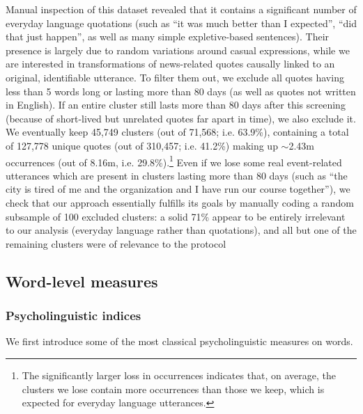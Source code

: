 Manual inspection of this dataset revealed that it contains a significant number of everyday language quotations (such as ``it was much better than I expected'', ``did that just happen'', as well as many simple expletive-based sentences).
Their presence is largely due to random variations around casual expressions, while we are interested in transformations of news-related quotes causally linked to an original, identifiable utterance.
To filter them out, we exclude all quotes having less than 5 words long or lasting more than 80 days %
 (as well as quotes not written in English). If an entire cluster still lasts more than 80 days after this screening (because of short-lived but unrelated quotes far apart in time), we also exclude it.
We eventually keep 45,749 clusters (out of 71,568; i.e. 63.9\%), containing a total of 127,778 unique quotes (out of 310,457; i.e. 41.2\%) making up $\sim$2.43m occurrences (out of 8.16m, i.e. 29.8\%).\footnote{The significantly larger loss in occurrences indicates that, on average, the clusters we lose contain more occurrences than those we keep, which is expected for everyday language utterances.}
Even if we lose some real event-related utterances which are present in clusters lasting more than 80 days (such as ``the city is tired of me and the organization and I have run our course together''), we check that our approach essentially fulfills its goals by manually coding a random subsample of 100 excluded clusters: a solid 71\% appear to be entirely irrelevant to our analysis (everyday language rather than quotations), and all but one of the remaining clusters were of relevance to the protocol %


\subsection{Word-level measures}

\subsubsection{Psycholinguistic indices}

We first introduce some of the most classical psycholinguistic measures on words.

